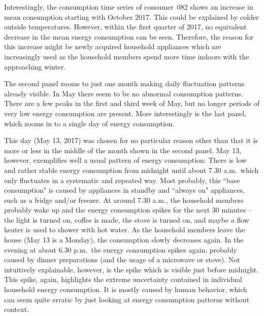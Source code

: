 Interestingly, the consumption time series of consumer~082 shows an increase in mean consumption starting with October 2017. This could be explained by colder outside temperatures. However, within the first quarter of 2017, no equivalent decrease in the mean energy consumption can be seen. Therefore, the reason for this increase might be newly acquired household appliances which are increasingly used as the household members spend more time indoors with the approaching winter.

The second panel zooms to just one month making daily fluctuation patterns already visible. In May there seem to be no abnormal consumption patterns. There are a few peaks in the first and third week of May, but no longer periods of very low energy consumption are present. More interestingly is the last panel, which zooms in to a single day of energy consumption. 

\noindent This day (May 13, 2017) was chosen for no particular reason other than that it is more or less in the middle of the month shown in the second panel. May 13, however, exemplifies well a usual pattern of energy consumption: There is low and rather stable energy consumption from midnight until about 7.30 a.m.~which only fluctuates in a systematic and repeated way. Most probably, this ``base consumption" is caused by appliances in standby and ``always on" appliances, such as a fridge and/or freezer. At around 7.30 a.m., the household members probably wake up and the energy consumption spikes for the next 30 minutes -- the light is turned on, coffee is made, the stove is turned on, and maybe a flow heater is used to shower with hot water. As the household members leave the house (May 13 is a Monday), the consumption slowly decreases again. In the evening at about 6.30 p.m.~the energy consumption spikes again, probably caused by dinner preparations (and the usage of a microwave or stove). Not intuitively explainable, however, is the spike which is visible just before midnight. This spike, again, highlights the extreme uncertainty contained in individual household energy consumption. It is mostly caused by human behavior, which can seem quite erratic by just looking at energy consumption patterns without context.

